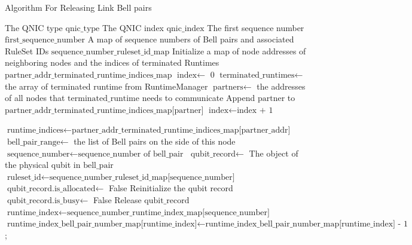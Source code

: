 \begin{algorithm}[H]  
  \caption{Algorithm For Releasing Link Bell pairs}                 
  \begin{algorithmic}[1]
    \Require The QNIC type $\text{qnic\_type}$
    \Require The QNIC index $\text{qnic\_index}$
    \Require The first sequence number $\text{first\_sequence\_number}$
    \Require A map of sequence numbers of Bell pairs and associated RuleSet IDs $\text{sequence\_number\_ruleset\_id\_map}$
    \State Initialize a map of node addresses of neighboring nodes and the indices of terminated Runtimes $\text{partner\_addr\_terminated\_runtime\_indices\_map}$
    \State $\text{index} \gets$ 0
    \State $\text{terminated\_runtimes} \gets$ the array of terminated runtime from RuntimeManager
      \State $\text{partners} \gets$ the addresses of all nodes that $\text{terminated\_runtime}$ needs to communicate
        \State Append $\text{partner}$ to $\text{partner\_addr\_terminated\_runtime\_indices\_map[partner]}$
      \EndFor
      \State $\text{index} \gets \text{index + 1}$
    \EndFor

      \State $\text{runtime\_indices} \gets \text{partner\_addr\_terminated\_runtime\_indices\_map[partner\_addr]}$
      \State $\text{bell\_pair\_range} \gets$ the list of Bell pairs on the side of this node
        \State $\text{sequence\_number} \gets \text{sequence\_number of bell\_pair}$
          \State $\text{qubit\_record} \gets$ The object of the physical qubit in $\text{bell\_pair}$
          \State $\text{ruleset\_id} \gets \text{sequence\_number\_ruleset\_id\_map[sequence\_number]}$
            \State $\text{qubit\_record.is\_allocated} \gets$ False
            \State Reinitialize the qubit record
                \State $\text{qubit\_record.is\_busy} \gets$ False
              \EndIf
                  \State Release $\text{qubit\_record}$ 
                  \State $\text{runtime\_index} \gets \text{sequence\_number\_runtime\_index\_map[sequence\_number]}$
                  \State $\text{runtime\_index\_bell\_pair\_number\_map[runtime\_index]} \gets \text{runtime\_index\_bell\_pair\_number\_map[runtime\_index] - 1}$;
                \EndIf
              \EndFor
            \EndIf
          \EndIf
      \EndFor
    \EndFor
  \end{algorithmic}
\end{algorithm}


